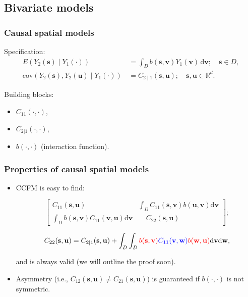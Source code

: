 \documentclass{beamer}
\newcommand{\svec} {\textbf{s}}
\newcommand{\uvec} {\textbf{u}}
\newcommand{\s}{\mathbf{s}}
\renewcommand{\v}{\mathbf{v}}
\renewcommand{\u}{\mathbf{u}}
\newcommand{\w}{\mathbf{w}}
\renewcommand{\d}{\mathrm{d}}
\newcommand{\E}{E}
\newcommand{\cov}{\mathrm{cov}}
\newcommand{\red}{\textcolor{red}}%
\newcommand{\blue}{\textcolor{blue}}
\begin{document}
\subsection{Bivariate models}

\begin{frame}
\frametitle{Causal spatial models}

Specification:
\begin{align}\label{eqn:E-and-cov}
\E\left(Y_2(\s)\mid Y_1(\cdot)\right)&\,=\int_D{b(\s,\v)Y_1(\v)\,\d \v};\quad \s\in D,\\
\cov\left(Y_2(\s),Y_2(\u)\mid Y_1(\cdot)\right)&\,=C_{2\mid 1}(\s,\u);\quad \s,\u\in \mathbb{R}^d.\end{align}

Building blocks:
\begin{itemize}
\item $C_{11}(\cdot,\cdot)$,
\item $C_{2|1}(\cdot,\cdot)$,
\item $b(\cdot,\cdot)$ (interaction function).
\end{itemize}
\end{frame}


\begin{frame}
\frametitle{Properties of causal spatial models}

\begin{itemize}
\item  CCFM is easy to find:

\begin{equation}
\begin{bmatrix} C_{11}(\s,\u) & \int_DC_{11}(\s,\v)b(\u,\v)\d\v \\ \int_Db(\s,\v)C_{11}(\v,\u)\d\v & ~~~~~C_{22}(\s,\u)\end{bmatrix};
\end{equation}

\begin{equation}
\small
C_{22}(\s,\u) = C_{2\mid 1}(\s,\u)+\int_D\int_D \red{b(\s,\v)} \blue{C_{11}(\v,\w)} \red{b(\w,\u)}\d\v\d\w,
\end{equation}

and is always valid (we will outline the proof soon). \vfill

\item Asymmetry (i.e., $C_{12}(\svec,\uvec) \ne C_{21}(\svec,\uvec)$) is guaranteed if $b(\cdot,\cdot)$ is not symmetric. \vfill
\end{itemize}
\end{frame}
\end{document}
